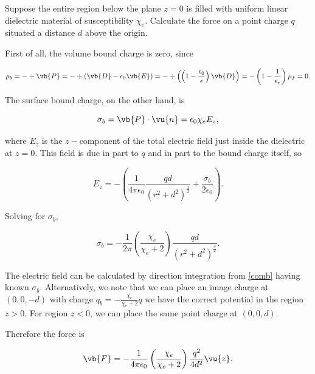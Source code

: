 \documentclass[english,a4paper,12pt]{report}
\begin{document}
{Suppose the entire region below the plane \(z=0\) is filled with uniform linear dielectric material of susceptibility \(\chi _{e} \). Calculate the force on a point charge \(q\) situated a distance \(d\) above the origin.}
{First of all, the volume bound charge is zero, since

\begin{equation}
    \rho _{b} = - \div{\vb{P} } = - \div{\left( \vb{D} - \epsilon _{0}\vb{E} \right)} = - \div{\left( \left(1- \frac{\epsilon _{0} }{\epsilon } \right) \vb{D} \right)} = - \left( 1- \frac{1}{\epsilon _{r} }  \right) \rho _{f} = 0.   
\end{equation}

The surface bound charge, on the other hand, is

\begin{equation}
    \sigma _{b} = \vb{P} \cdot \vu{n} = \epsilon _{0} \chi _{e}E_{z},    
\end{equation}

where \(E_{z} \) is the \(z-\)component of the total electric field just inside the dielectric at \(z=0\). This field is due in part to \(q\) and in part to the bound charge itself, so 

\begin{equation}
    E_{z} = - \left( \frac{1}{4\pi \epsilon_0} \frac{qd}{(r^2+d^2)^{\frac{3}{2} } } + \frac{\sigma _{b} }{2\epsilon _{0} }  \right).
\end{equation}

Solving for \(\sigma _{b} \), 

\begin{equation}
    \sigma _{b} = - \frac{1}{2\pi }\left( \frac{\chi _{e} }{\chi _{e}+2 }  \right)\frac{qd}{(r^2+d^2)^{\frac{3}{2} } }.   
\end{equation}

The electric field can be calculated by direction integration from \cref{comb} having known \(\sigma _{b} \). Alternatively, we note that we can place an image charge at \((0,0,-d)\) with charge \(\displaystyle q_{b} = -\frac{\chi _{e} }{\chi _{e}+2 } q \) we have the correct potential in the region \(z > 0\). For region \(z < 0\), we can place the same point charge at \((0,0,d)\).

Therefore the force is 

\begin{equation}
    \vb{F} = - \frac{1}{4\pi \epsilon_0} \left( \frac{\chi _{e} }{\chi _{e}+2 }  \right) \frac{q^2}{4d^2}\vu{z} . 
\end{equation}
} 
\end{document}
